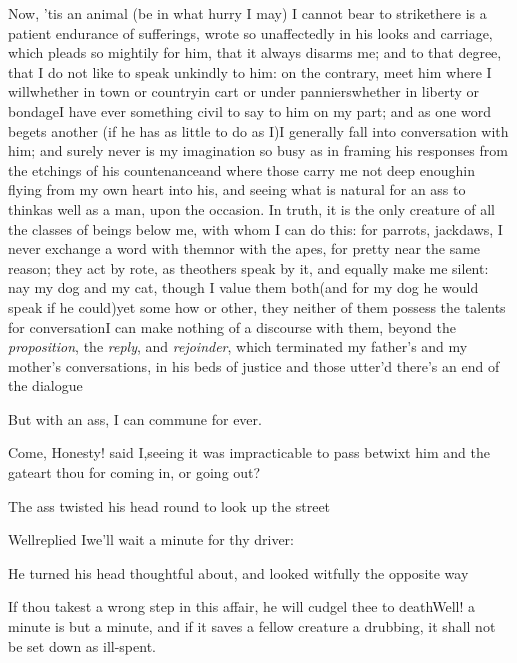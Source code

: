 \documentclass{article}
\begin{document}
Now, ’tis an animal (be in what hurry I may) I cannot bear to strike\tsh there is a
patient endurance of sufferings, wrote so unaffectedly in his looks and carriage,
which pleads so mightily for him, that it always disarms me; and to that degree,
that I do not like to speak unkindly to him: on the contrary,
meet him where I\pb
will\tsk whether in town or country\tsk in cart or under
panniers\tsk whether in liberty or bondage\tsh I have ever
something civil to say to him on my part; and as one word begets
another (if he has as little to do as I)\tsh I generally fall
into conversation with him; and surely never is my imagination
so busy as in framing his responses from the etchings of his
countenance\tsk and where those carry me not deep enough\tsk in
flying from my own heart into his, and seeing what is natural
for an ass to think\tsk as well as a man, upon the occasion. In
truth, it is the only creature of all the classes of beings
below me, with whom I can do this: for parrots, jackdaws,
\etc\@\tsh I never exchange a word with them\tsh nor with the
apes, \etc for pretty near the same reason; they act
by rote, as the\pb others speak by it, and equally make me silent:
nay my dog and my cat, though I value them both\tsh (and for my
dog he would speak if he could)\tsk yet some how or other, they
neither of them possess the talents for conversation\tsh I
can\break
make nothing of a discourse with them, beyond the
\textit{proposition}, the \textit{reply}, and
\textit{rejoinder}, which terminated my father’s and my mother’s
conversations, in his beds of justice \tsh and those utter’d\tsh
there’s an end of the dialogue\tsh

\tsh But with an ass, I can commune for ever.

Come, Honesty! said I,\tsk seeing it was\break
impracticable to pass betwixt him and\break
the gate\tsh art thou for coming in, or\break
going out?

\newpage
The ass twisted his head round to look up the street\tsh

Well\tsk replied I\tsk we’ll wait a minute for thy driver:

\tsh He turned his head thoughtful about, and looked
witfully the opposite way\tsh

\noindent
{}\break
\tsh If thou takest a wrong step in this affair, he will cudgel thee to
death\tsh Well! a minute is but a minute, and if it saves
a fellow creature a drubbing, it shall not be set down as
ill-spent.
\end{document}

